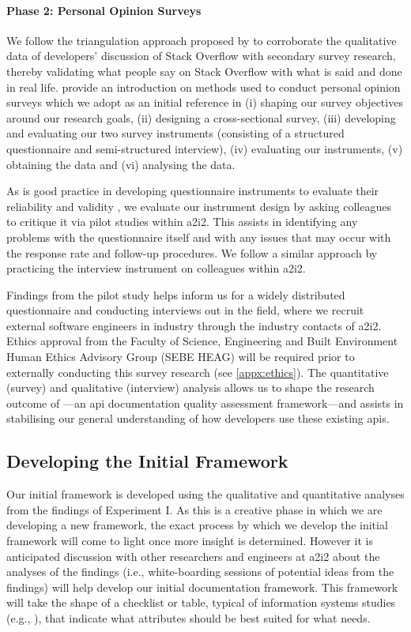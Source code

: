 \paragraph{Phase 2: Personal Opinion Surveys}
We follow the triangulation approach proposed by \citet{Jick:1979el} to corroborate the qualitative data of developers' discussion of Stack Overflow with secondary survey research, thereby validating what people say on Stack Overflow with what is said and done in real life. \citet{Kitchenham:2007ux} provide an introduction on methods used to conduct personal opinion surveys which we adopt as an initial reference in (i) shaping our survey objectives around our research goals, (ii) designing a cross-sectional survey, (iii) developing and evaluating our two survey instruments (consisting of a structured questionnaire and semi-structured interview), (iv) evaluating our instruments, (v) obtaining the data and (vi) analysing the data.

As is good practice in developing questionnaire instruments to evaluate their reliability and validity \citep{Litwin:1995wt}, we evaluate our instrument design by asking colleagues to critique it via pilot studies within \gls{a2i2}. This assists in identifying any problems with the questionnaire itself and with any issues that may occur with the response rate and follow-up procedures. We follow a similar approach by practicing the interview instrument on colleagues within \gls{a2i2}.

Findings from the pilot study helps inform us for a widely distributed questionnaire and conducting interviews out in the field, where we recruit external software engineers in industry through the industry contacts of \gls{a2i2}. Ethics approval from the Faculty of Science, Engineering and Built Environment Human Ethics Advisory Group (SEBE HEAG) will be required prior to externally conducting this survey research (see \cref{appx:ethics}). The quantitative (survey) and qualitative (interview) analysis allows us to shape the research outcome of ---an \gls{api} documentation quality assessment framework---and assists in stabilising our general understanding of how developers use these existing \glspl{api}.

\subsection{Developing the Initial Framework}

Our initial framework is developed using the qualitative and quantitative analyses from the findings of Experiment I. As this is a creative phase in which we are developing a new framework, the exact process by which we develop the initial framework will come to light once more insight is determined. However it is anticipated discussion with other researchers and engineers at \gls{a2i2} about the analyses of the findings (i.e., white-boarding sessions of potential ideas from the findings) will help develop our initial documentation framework. This framework will take the shape of a checklist or table, typical of information systems studies (e.g., \citep{Lau:1999vs}), that indicate what attributes should be best suited for what needs.

